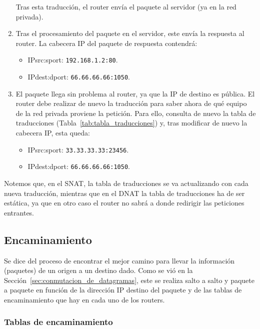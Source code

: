 \begin{ejemplo}
\begin{enumerate}[label=(\arabic*)]
        Tras esta traducción, el router envía el paquete al servidor (ya en la red privada).
        
        \item Tras el procesamiento del paquete en el servidor, este envía la respuesta al router. La cabecera IP del paquete de respuesta contendrá:
            \begin{itemize}
                \item {IPsrc}:{sport}: \verb|192.168.1.2:80|.
                \item {IPdest}:{dport}: \verb|66.66.66.66:1050|.
            \end{itemize}
        
        \item El paquete llega sin problema al router, ya que la IP de destino es pública. El router debe realizar de nuevo la traducción para saber ahora de qué equipo de la red privada proviene la petición. Para ello, consulta de nuevo la tabla de traducciones (Tabla~\ref{tab:tabla_traducciones}) y, tras modificar de nuevo la cabecera IP, esta queda:
            \begin{itemize}
                \item {IPsrc}:{sport}: \verb|33.33.33.33:23456|.
                \item {IPdest}:{dport}: \verb|66.66.66.66:1050|.
            \end{itemize}
    \end{enumerate}

    Notemos que, en el \acrshort{SNAT}, la tabla de traducciones se va actualizando con cada nueva traducción, mientras que en el \acrshort{DNAT} la tabla de traducciones ha de ser estática, ya que en otro caso el router no sabrá a donde redirigir las peticiones entrantes.
\end{ejemplo}

\subsection{Encaminamiento}
Se dice del proceso de encontrar el mejor camino para llevar la información (paquetes) de un origen a un destino dado. Como se vió en la Sección~\ref{sec:conmutacion_de_datagramas}, este se realiza salto a salto y paquete a paquete en función de la dirección IP destino del paquete y de las tablas de encaminamiento que hay en cada uno de los routers.

\subsubsection{Tablas de encaminamiento}

